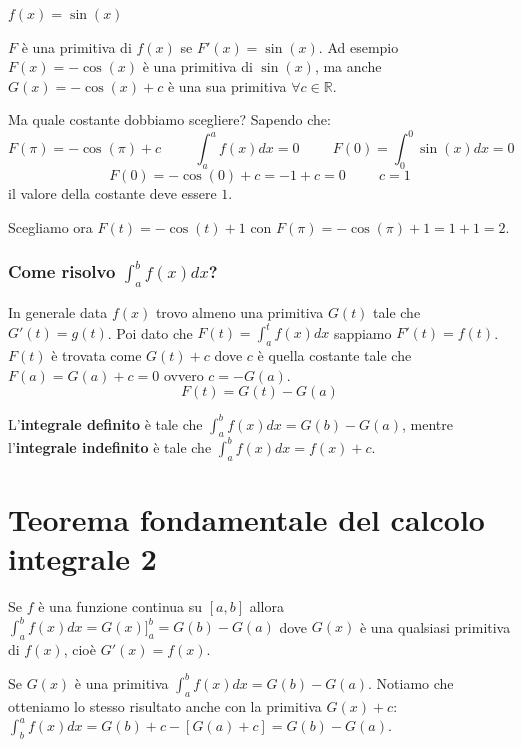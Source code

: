 \begin{example}
    $f(x)=\sin(x)$
    
    $F$ è una primitiva di $f(x)$ se $F'(x)=\sin(x)$. Ad esempio $F(x)=-\cos(x)$ è una primitiva di $\sin(x)$, ma anche $G(x)=-\cos(x)+c$ è una sua primitiva $\forall c\in\mathbb{R}$.
    
    Ma quale costante dobbiamo scegliere? Sapendo che:
    \begin{equation*}
        F(\pi)=-\cos(\pi)+c\hspace{1cm}\int^a_af(x)dx=0\hspace{1cm}F(0)=\int^0_0\sin(x)dx=0
    \end{equation*}
    \begin{equation*}
        F(0)=-\cos(0)+c=-1+c=0\hspace{1cm}c=1
    \end{equation*}
    il valore della costante deve essere $1$.
    
    Scegliamo ora $F(t)=-\cos(t)+1$ con $F(\pi)=-\cos(\pi)+1=1+1=2$.
\end{example}

\subsubsection*{Come risolvo $\int^b_af(x)dx$?}

In generale data $f(x)$ trovo almeno una primitiva $G(t)$ tale che $G'(t)=g(t)$. Poi dato che $F(t)=\int^t_af(x)dx$ sappiamo $F'(t)=f(t)$. $F(t)$ è trovata come $G(t)+c$ dove $c$ è quella costante tale che $F(a)=G(a)+c=0$ ovvero $c=-G(a)$.\begin{equation*}F(t)=G(t)-G(a)\end{equation*}

\begin{definition*}
    L'\textbf{integrale definito} è tale che $\int^b_af(x)dx=G(b)-G(a)$, mentre l'\textbf{integrale indefinito} è tale che $\int^b_af(x)dx=f(x)+c$.

\end{definition*}

\section{Teorema fondamentale del calcolo integrale 2}
Se $f$ è una funzione continua su $[a,b]$ allora $\int^b_af(x)dx=G(x)]^b_a=G(b)-G(a)$ dove $G(x)$ è una qualsiasi primitiva di $f(x)$, cioè $G'(x)=f(x)$.

Se $G(x)$ è una primitiva $\int^b_af(x)dx=G(b)-G(a)$. Notiamo che otteniamo lo stesso risultato anche con la primitiva $G(x)+c$: $\int^a_bf(x)dx=G(b)+c-[G(a)+c]=G(b)-G(a)$.


